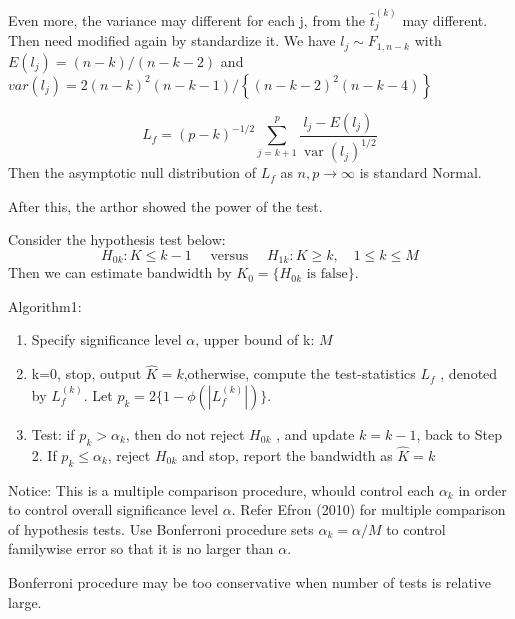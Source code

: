 \documentclass{beamer}
\begin{document}
\begin{frame}

Even more, the variance may different for each j, from the
\(\hat t_j^{(k)}\) may different. Then need modified again by
standardize it. We have \(l_j\sim F_{1,n-k}\) with
\(E(l_j)=(n-k)/(n-k-2)\) and
\(var(l_j)=2(n-k)^2(n-k-1)/ \left\{ ( n - k - 2 ) ^ { 2 } ( n - k - 4 ) \right\}\)

\[
L _ { f } = ( p - k ) ^ { - 1 / 2 } \sum _ { j = k + 1 } ^ { p } \frac { l _ { j } - E \left( l _ { j } \right) } { \operatorname { var } \left( l _ { j } \right) ^ { 1 / 2 } }
\] Then the asymptotic null distribution of \(L_f\) as
\(n,p\rightarrow \infty\) is standard Normal.

After this, the arthor showed the power of the test.

Consider the hypothesis test below: \[
H _ { 0 k } : K \leqslant k - 1 \quad \text { versus } \quad H _ { 1 k } : K \geqslant k , \quad 1 \leqslant k \leqslant M
\] Then we can estimate bandwidth by
\(K_0=\{H_{0k} \text{ is false}\}\).

\end{frame}


\begin{frame}
Algorithm1:
\begin{enumerate}
\item
  Specify significance level \(\alpha\), upper bound of k: \(M\)
\item
  k=0, stop, output \(\hat K=k\),otherwise, compute the test-statistics
  \(L_f\) , denoted by \(L_f^{(k)}\). Let
  \(p_k=2\{1-\phi(|L_f^{(k)}|)\}\).
\item
  Test: if \(p_k>\alpha_k\), then do not reject \(H_{0k}\) , and update
  \(k=k-1\), back to Step 2. If \(p_k\leqslant \alpha_k\), reject
  \(H_{0k}\) and stop, report the bandwidth as \(\hat K=k\)
\end{enumerate}

Notice: This is a multiple comparison procedure, whould control each
\(\alpha_k\) in order to control overall significance level \(\alpha\).
Refer Efron (2010) for multiple comparison of hypothesis tests. Use
Bonferroni procedure sets \(\alpha_k=\alpha/M\) to control familywise
error so that it is no larger than \(\alpha\).

Bonferroni procedure may be too conservative when number of tests is
relative large. 

\end{frame}
\end{document}
